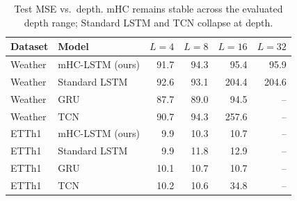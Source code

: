\begin{table}[t]
\centering
\caption{Test MSE vs.\ depth. mHC remains stable across the evaluated depth range; Standard LSTM and TCN collapse at depth.}
\label{tab:depth}
\footnotesize
\begin{tabular}{llrrrr}
\toprule
Dataset & Model & $L{=}4$ & $L{=}8$ & $L{=}16$ & $L{=}32$ \\
\midrule
Weather & mHC-LSTM (ours) & 91.7 & 94.3 & 95.4 & 95.9 \\
Weather & Standard LSTM & 92.6 & 93.1 & 204.4 & 204.6 \\
Weather & GRU & 87.7 & 89.0 & 94.5 & -- \\
Weather & TCN & 90.7 & 94.3 & 257.6 & -- \\
\midrule
ETTh1 & mHC-LSTM (ours) & 9.9 & 10.3 & 10.7 & -- \\
ETTh1 & Standard LSTM & 9.9 & 11.8 & 12.9 & -- \\
ETTh1 & GRU & 10.1 & 10.7 & 10.7 & -- \\
ETTh1 & TCN & 10.2 & 10.6 & 34.8 & -- \\
\bottomrule
\end{tabular}
\end{table}
